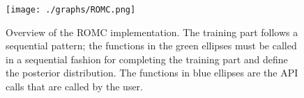 \begin{figure}[!ht]
    \begin{center}
      \texttt{[image: ./graphs/ROMC.png]}
    \end{center}
    \caption{Overview of the ROMC implementation. The training part follows a sequential pattern; the functions in the green ellipses must be called in a sequential fashion for completing the training part and define the posterior distribution. The functions in blue ellipses are the API calls that are called by the user.}
    \label{fig:elfi-model}
\end{figure}